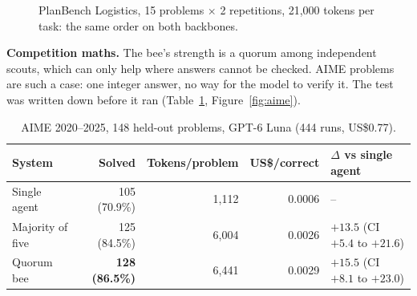 \documentclass[12pt,a4paper]{article}
\newcommand{\head}[1]{\textbf{#1}}
\newcommand{\runin}[1]{\textbf{#1}\quad}
\begin{document}
\begin{figure}[H]
\centering
{}
\caption{PlanBench Logistics, 15 problems $\times$ 2 repetitions, 21,000 tokens per task: the same order
on both backbones.}
\label{fig:logistics}
\end{figure}

\runin{Competition maths.} The bee's strength is a quorum among independent scouts, which can only help
where answers cannot be checked. AIME problems are such a case: one integer answer, no way for the model
to verify it. The test was written down before it ran (Table~\ref{tab:aime}, Figure~\ref{fig:aime}).

\begin{table}[H]
\centering\footnotesize
\caption{AIME 2020--2025, 148 held-out problems, GPT-6 Luna (444 runs, US\$0.77).}
\label{tab:aime}
\begin{tabular}{@{}lrrrl@{}}
\toprule
\head{System} & \head{Solved} & \head{Tokens/problem} & \head{US\$/correct} & \head{$\Delta$ vs single agent} \\
\midrule
Single agent & 105 (70.9\%) & 1,112 & 0.0006 & -- \\
Majority of five & 125 (84.5\%) & 6,004 & 0.0026 & $+13.5$ (CI $+5.4$ to $+21.6$) \\
Quorum bee & \textbf{128 (86.5\%)} & 6,441 & 0.0029 & $+15.5$ (CI $+8.1$ to $+23.0$) \\
\bottomrule
\end{tabular}
\end{table}
\end{document}
